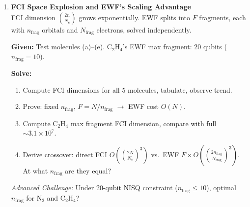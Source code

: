 \documentclass[fontset=mac]{ctexart}
\begin{document}
\begin{enumerate}
    \emph{Advanced Challenge:} Design a hybrid --- VQE's shallow circuit for state prep, SQD's diagonalization for post-processing. What is the energy lower bound?

    \textbf{Solution:}
    \begin{enumerate}[label=(\alph*)]
        \item
        \item
        \item
    \end{enumerate}

    \item \textbf{FCI Space Explosion and EWF's Scaling Advantage} \\ FCI dimension $\binom{2n}{N_e}$ grows exponentially. EWF splits into $F$ fragments, each with $n_{\text{frag}}$ orbitals and $N_{\text{frag}}$ electrons, solved independently.

    \textbf{Given:} Test molecules (a)--(e). C$_2$H$_4$'s EWF max fragment: 20 qubits {\color{red}($n_{\text{frag}}{=}10$).}

    \textbf{Solve:}
    \begin{enumerate}[label=(\alph*)]
        \item Compute FCI dimensions for all 5 molecules, tabulate, observe trend.
        \item Prove: fixed $n_{\text{frag}}$, $F=N/n_{\text{frag}}$ $\to$ EWF cost $O(N)$.
        \item Compute C$_2$H$_4$ max fragment FCI dimension, compare with full $\sim 3.1\times10^7$.
        \item Derive crossover: direct FCI $O(\binom{2N}{N_e}^3)$ vs.\ EWF $F \times O(\binom{2n_{\text{frag}}}{N_{\text{frag}}}^3)$. At what $n_{\text{frag}}$ are they equal?
    \end{enumerate}

    \emph{Advanced Challenge:} Under 20-qubit NISQ constraint ($n_{\text{frag}}\leq 10$), optimal $n_{\text{frag}}$ for N$_2$ and C$_2$H$_4$?


\end{enumerate}
\end{document}

